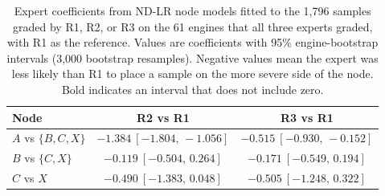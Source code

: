 \begin{table}[t]
\centering
\small
\caption{Expert coefficients from ND-LR node models fitted to the 1{,}796 samples graded by R1, R2, or R3 on the 61 engines that all three experts graded, with R1 as the reference. Values are coefficients with 95\% engine-bootstrap intervals (3{,}000 bootstrap resamples). Negative values mean the expert was less likely than R1 to place a sample on the more severe side of the node. Bold indicates an interval that does not include zero.}
\label{tab:analyst_effects}
\begin{tabular}{lcc}
\hline
Node & R2 vs R1 & R3 vs R1 \\
\hline
$A$ vs $\{B,C,X\}$ &
$\mathbf{-1.384\ [-1.804,\,-1.056]}$ &
$\mathbf{-0.515\ [-0.930,\,-0.152]}$ \\
$B$ vs $\{C,X\}$ &
$-0.119\ [-0.504,\,0.264]$ &
$-0.171\ [-0.549,\,0.194]$ \\
$C$ vs $X$ &
$-0.490\ [-1.383,\,0.048]$ &
$-0.505\ [-1.248,\,0.322]$ \\
\hline
\end{tabular}
\end{table}
